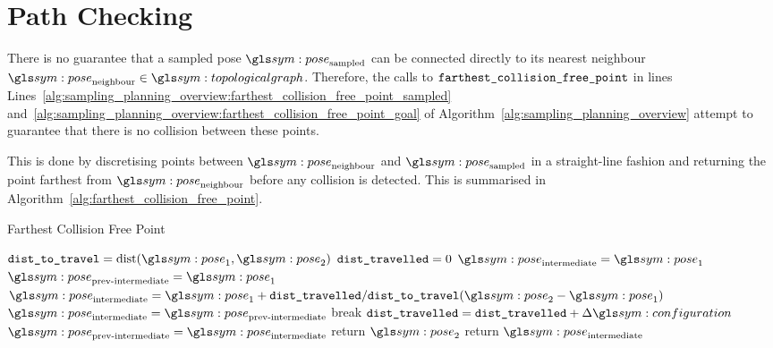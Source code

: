 	\section{Path Checking}%
	\label{sec:path_checking}

		\begin{sloppypar}

			There is no guarantee that a sampled pose $\pose_\text{sampled}$ can
			be connected directly to its nearest neighbour
			$\pose_\text{neighbour} \in \topologicalgraph$.  Therefore, the calls to
			$\texttt{farthest\_collision\_free\_point}$ in lines
			Lines~\ref{alg:sampling_planning_overview:farthest_collision_free_point_sampled}
			and~\ref{alg:sampling_planning_overview:farthest_collision_free_point_goal}
			of Algorithm~\ref{alg:sampling_planning_overview} attempt to
			guarantee that there is no collision between these points.

		\end{sloppypar}

		This is done by discretising points between $\pose_\text{neighbour}$ and
		$\pose_\text{sampled}$ in a straight-line fashion and returning the
		point farthest from $\pose_\text{neighbour}$ before any collision is
		detected. This is summarised in
		Algorithm~\ref{alg:farthest_collision_free_point}.

		\begin{algorithm}[ht]
			\caption{Farthest Collision Free Point}%
			\label{alg:farthest_collision_free_point}
			\begin{algorithmic}[1]
					\State{}$\code{dist\_to\_travel} = \dist(\pose_1, \pose_2)$
					\State{}$\texttt{dist\_travelled} = 0$
					\State{}$\pose_\text{intermediate} = \pose_1$
					\State{}$\pose_\text{prev-intermediate} = \pose_1$
						\State{}
							\(
								\pose_\text{intermediate} =
								\pose_1 +
								\code{dist\_travelled}/\code{dist\_to\_travel}
								(
									\pose_2 - \pose_1
								)
							\)
							\State{}$\pose_\text{intermediate} =
								\pose_\text{prev-intermediate}$
							\State{}break
						\EndIf{}
						\State{}$\code{dist\_travelled} =
							\code{dist\_travelled} + \Delta\configuration$
						\State{}$\pose_\text{prev-intermediate} =
							\pose_\text{intermediate}$
					\EndWhile{}
						\State{}return $\pose_2$
					\EndIf{}
					\State{}return $\pose_\text{intermediate}$
				\EndProcedure{}
			\end{algorithmic}
		\end{algorithm}

